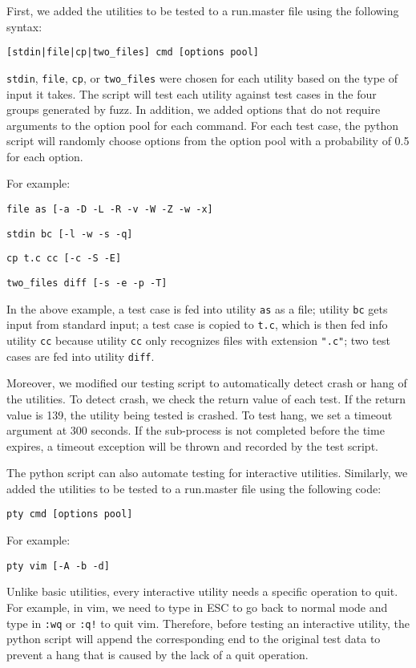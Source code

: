 First, we added the utilities to be tested to a run.master file using the following syntax:

\texttt{[stdin|file|cp|two\_files] cmd [options pool]}


\texttt{stdin}, \texttt{file}, \texttt{cp}, or \texttt{two\_files} were chosen for each utility based on the type of input it takes. The script will test each utility against test cases in the four groups generated by fuzz. In addition, we added options that do not require arguments to the option pool for each command. For each test case, the python script will randomly choose options from the option pool with a probability of 0.5 for each option.

For example: 

\texttt{file as [-a -D -L -R -v -W -Z -w -x]}

\texttt{stdin bc [-l -w -s -q]}

\texttt{cp t.c cc [-c -S -E]}

\texttt{two\_files diff [-s -e -p -T]}

In the above example, a test case is fed into utility \texttt{as} as a file; utility \texttt{bc} gets input from standard input; a test case is copied to \texttt{t.c}, which is then fed info utility \texttt{cc} because utility \texttt{cc} only recognizes files with extension \texttt{".c"}; two test cases are fed into utility \texttt{diff}.

Moreover, we modified our testing script to automatically detect crash or hang of the utilities. To detect crash, we check the return value of each test. If the return value is 139, the utility being tested is crashed. To test hang, we set a timeout argument at 300 seconds. If the sub-process is not completed before the time expires, a timeout exception will be thrown and recorded by the test script.

The python script can also automate testing for interactive utilities. Similarly, we added the utilities to be tested to a run.master file using the following code:

\texttt{pty cmd [options pool]}

For example: 

\texttt{pty vim [-A -b -d]}

Unlike basic utilities, every interactive utility needs a specific operation to quit. For example, in vim, we need to type in ESC to go back to normal mode and type in \texttt{:wq} or \texttt{:q!} to quit vim. 
Therefore, before testing an interactive utility, the python script will append the corresponding end to the original test data to prevent a hang that is caused by the lack of a quit operation.


